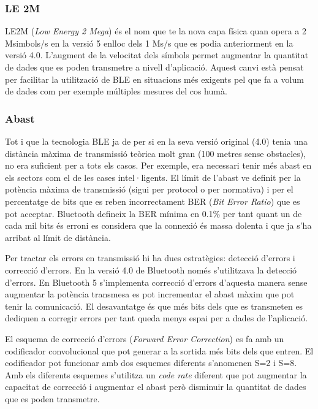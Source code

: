 \subsubsection{LE 2M}
LE2M (\textit{Low Energy 2 Mega}) és el nom que te la nova capa física quan opera a 2 Msimbols/s en la versió 5 enlloc dels 1 Ms/s que es podia anteriorment en la versió 4.0.
L'augment de la velocitat dels símbols permet augmentar la quantitat de dades que es poden transmetre a nivell d'aplicació.
Aquest canvi està pensat per facilitar la utilització de BLE en situacions més exigents pel que fa a volum de dades com per exemple múltiples mesures del cos humà.

\subsubsection{Abast}
Tot i que la tecnologia BLE ja de per si en la seva versió original (4.0) tenia una distància màxima de transmissió teòrica molt gran (100 metres sense obstacles), no era suficient per a tots els casos.
Per exemple, era necessari tenir més abast en els sectors com el de les cases intel·ligents.
El límit de l'abast ve definit per la potència màxima de transmissió (sigui per protocol o per normativa) i per el percentatge de bits que es reben incorrectament BER (\textit{Bit Error Ratio}) que es pot acceptar.
Bluetooth defineix la BER mínima en 0.1\% per tant quant un de cada mil bits és erroni es considera que la connexió és massa dolenta i que ja s'ha arribat al límit de distància.

Per tractar els errors en transmissió hi ha dues estratègies: detecció d'errors i correcció d'errors.
En la versió 4.0 de Bluetooth només s'utilitzava la detecció d'errors.
En Bluetooth 5 s'implementa correcció d'errors d'aquesta manera sense augmentar la potència transmesa es pot incrementar el abast màxim que pot tenir la comunicació.
El desavantatge és que més bits dels que es transmeten es dediquen a corregir errors per tant queda menys espai per a dades de l'aplicació.


El esquema de correcció d'errors (\textit{Forward Error Correction}) es fa amb un codificador convolucional que pot generar a la sortida més bits dels que entren. El codificador pot funcionar amb dos esquemes diferents s'anomenen S=2 i S=8.
Amb els diferents esquemes s'utilitza un \textit{code rate} diferent que pot augmentar la capacitat de correcció i augmentar el abast però disminuir la quantitat de dades que es poden transmetre.

